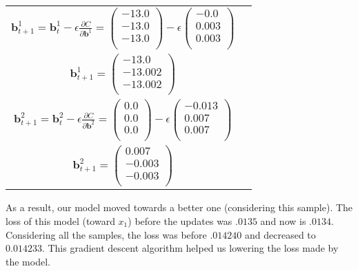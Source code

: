 \begin{tabular}{cc}
				\hline
				$ \boldsymbol{b}^1_{t+1} = \boldsymbol{b}^1_t - \epsilon \frac{\partial C}{\partial \boldsymbol{b}^1} = 
					\left( \begin{matrix}
					-13.0 \\
					-13.0 \\
					-13.0 \\
					\end{matrix} \right) - \epsilon 
					\left( \begin{matrix}
					-0.0 \\
					0.003 \\
					0.003 \\
					\end{matrix} \right)$ \\
				$ \boldsymbol{b}^1_{t+1} = 
					\left( \begin{matrix}
					-13.0 \\
					-13.002 \\
					-13.002 \\
					\end{matrix} \right)$ \\

				\hline
 				$ \boldsymbol{b}^2_{t+1} = \boldsymbol{b}^2_t - \epsilon \frac{\partial C}{\partial \boldsymbol{b}^2} = 
					\left( \begin{matrix}
					0.0 \\
					0.0 \\
					0.0 \\
					\end{matrix} \right) - \epsilon 
					\left( \begin{matrix}
					-0.013 \\
					0.007 \\
					0.007 \\
					\end{matrix} \right)$ \\
				$ \boldsymbol{b}^2_{t+1} = 
					\left( \begin{matrix}
					0.007 \\
					-0.003 \\
					-0.003 \\
					\end{matrix} \right)$ \\
			\end{tabular}

			As a result, our model moved towards a better one (considering this sample). The loss of this model (toward $x_1$) before the updates was $.0135$ and now is $.0134$. Considering all the samples, the loss was before $.014240$ and decreased to $0.014233$. This gradient descent algorithm helped us lowering the loss made by the model.